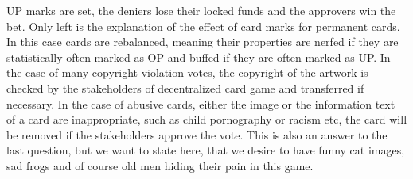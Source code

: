 \documentclass{article}
\begin{document}
UP marks are set, the deniers lose their locked funds and the approvers win the bet. Only left is the explanation of the effect of card marks for permanent cards. In this case cards are rebalanced, meaning their properties are nerfed if they are statistically often marked as OP and buffed if they are often marked as UP. In the case of many copyright violation votes, the copyright of the artwork is checked by the stakeholders of decentralized card game and transferred if necessary. In the case of abusive cards, either the image or the information text of a card are inappropriate, such as child pornography or racism etc, the card will be removed if the stakeholders approve the vote. This is also an answer to the last question, but we want to state here, that we desire to have funny cat images, sad frogs and of course old men hiding their pain in this game.
%
\end{document}
